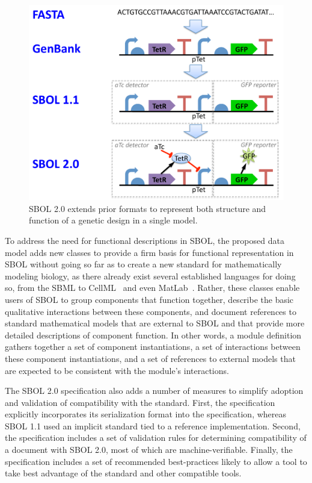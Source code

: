 \begin{figure}
\centering
\includegraphics[width=5in]{images/format-comparison.pdf}
\caption{SBOL 2.0 extends prior formats to represent both structure and function of a genetic design in a single model.}
\end{figure}


To address the need for functional descriptions in SBOL, the proposed data model adds new classes to provide a firm basis for functional representation in SBOL without going so far as to create a new standard for mathematically modeling biology, as there already exist several established languages for doing so, from the SBML to CellML~\cite{CellML} and even MatLab~\cite{matlab}. Rather, these classes enable users of SBOL to group components that function together, describe the basic qualitative interactions between these components, and document references to standard mathematical models that are external to SBOL and that provide more detailed descriptions of component function. In other words, a module definition gathers together a set of component instantiations, a set of interactions between these component instantiations, and a set of references to external models that are expected to be consistent with the module's interactions.

The SBOL 2.0 specification also adds a number of measures to simplify adoption and validation of compatibility with the standard.
First, the specification explicitly incorporates its serialization format into the specification, whereas SBOL 1.1 used an implicit standard tied to a reference implementation.
Second, the specification includes a set of validation rules for determining compatibility of a document with SBOL 2.0, most of which are machine-verifiable.
Finally, the specification includes a set of recommended best-practices likely to allow a tool to take best advantage of the standard and other compatible tools.

